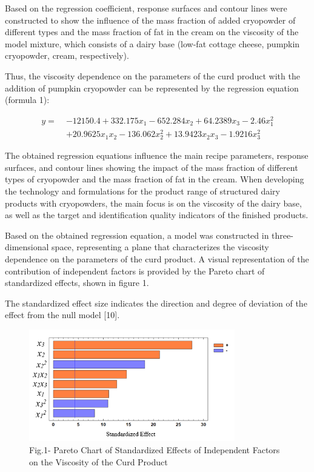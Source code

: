 Based on the regression coefficient, response surfaces and contour lines
were constructed to show the influence of the mass fraction of added
cryopowder of different types and the mass fraction of fat in the cream
on the viscosity of the model mixture, which consists of a dairy base
(low-fat cottage cheese, pumpkin cryopowder, cream, respectively).

Thus, the viscosity dependence on the parameters of the curd product
with the addition of pumpkin cryopowder can be represented by the
regression equation (formula 1):

\begin{align}
y =\; & -12150.4 + 332.175x_1 - 652.284x_2 + 64.2389x_3 - 2.46x_1^2 \nonumber \\
     & + 20.9625x_1x_2 - 136.062x_2^2 + 13.9423x_2x_3 - 1.9216x_3^2
\end{align}

\begin{multicols}{2}
The obtained regression equations influence the main recipe parameters,
response surfaces, and contour lines showing the impact of the mass
fraction of different types of cryopowder and the mass fraction of fat
in the cream. When developing the technology and formulations for the
product range of structured dairy products with cryopowders, the main
focus is on the viscosity of the dairy base, as well as the target and
identification quality indicators of the finished products.

Based on the obtained regression equation, a model was constructed in
three-dimensional space, representing a plane that characterizes the
viscosity dependence on the parameters of the curd product. A visual
representation of the contribution of independent factors is provided by
the Pareto chart of standardized effects, shown in figure 1.

The standardized effect size indicates the direction and degree of
deviation of the effect from the null model {[}10{]}.
\end{multicols}

\begin{figure}[H]
	\centering
	\includegraphics[width=0.8\textwidth]{media/pish2/image81}
	\caption*{Fig.1- Pareto Chart of Standardized Effects of Independent Factors on the Viscosity of the Curd Product}
\end{figure}

